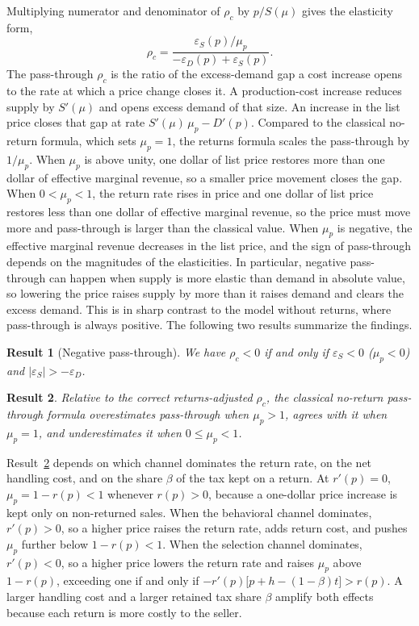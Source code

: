 \documentclass[11pt]{article}
\newtheorem{result}{Result}
\begin{document}
Multiplying numerator and denominator of $\rho_c$ by $p/S(\mu)$
gives the elasticity form,
\begin{equation}
  \rho_c
  =
  \frac{\varepsilon_S(p)/\mu_p}
       {-\varepsilon_D(p)+\varepsilon_S(p)}.
  \label{eq:rho_c_elasticity_final}
\end{equation}
The pass-through $\rho_c$ is the ratio of the excess-demand gap a
cost increase opens to the rate at which a price change closes it. A
production-cost increase reduces supply by $S'(\mu)$ and opens excess
demand of that size. An increase in the list price closes that gap at
rate $S'(\mu)\,\mu_p-D'(p)$. Compared to the classical no-return
formula, which sets $\mu_p=1$, the returns formula scales the
pass-through by $1/\mu_p$. When $\mu_p$ is above unity, one dollar
of list price restores more than one dollar of effective marginal revenue, so a
smaller price movement closes the gap. When $0<\mu_p<1$, the return
rate rises in price and one dollar of list price restores less than
one dollar of effective marginal revenue, so the price must move more and
pass-through is larger than the classical value. When $\mu_p$ is
negative, the effective marginal revenue decreases in the list price, and the
sign of pass-through depends on the magnitudes of the elasticities. In
particular, negative pass-through can happen when supply is more
elastic than demand in absolute value, so lowering the price raises
supply by more than it raises demand and clears the excess demand.
This is in sharp contrast to the model without returns, where
pass-through is always positive. The following two results summarize
the findings.
\begin{result}[Negative pass-through]
\label{res:negative-pt}
  We have $\rho_c<0$ if and only if $\varepsilon_S<0$ ($\mu_p<0$) and
  $|\varepsilon_S|>-\varepsilon_D$.
\end{result}
\begin{result}
\label{res:pt-bias-er}
  Relative to the correct returns-adjusted $\rho_c$, the classical
  no-return pass-through formula overestimates pass-through when
  $\mu_p>1$, agrees with it when $\mu_p=1$, and underestimates it
  when $0\leq\mu_p<1$.
\end{result}

Result~\ref{res:pt-bias-er} depends on which channel dominates the return
rate, on the net handling cost, and on the share $\beta$ of the tax kept
on a return. At $r'(p)=0$, $\mu_p=1-r(p)<1$ whenever $r(p)>0$, because a
one-dollar price increase is kept only on non-returned sales. When the
behavioral channel dominates, $r'(p)>0$, so a higher price raises the return
rate, adds return cost, and pushes $\mu_p$ further below $1-r(p)<1$. When the
selection channel dominates, $r'(p)<0$, so a higher price lowers the return
rate and raises $\mu_p$ above $1-r(p)$, exceeding one if and only if
$-r'(p)\bigl[p+h-(1-\beta)t\bigr]>r(p)$. A larger handling cost and a larger
retained tax share $\beta$ amplify both effects because each return is more
costly to the seller.
\end{document}
